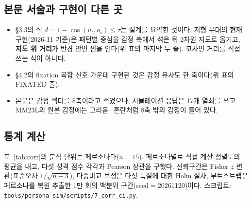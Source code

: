 \documentclass[11pt, a4paper]{article}
\begin{document}
\subsection{본문 서술과 구현이 다른 곳}

\begin{itemize}
  \item \S3.3의 식 $d = 1 - \cos(u_t, o_s) \leq \tau$는 설계를 요약한 것이다. 지형 무대의 현재 구현(2026-11 기준)은 패턴별 중심을 감정 축에서 섞은 뒤 2차원 지도로 옮기고, \textbf{지도 위 거리}가 반경 안인 씬을 연다(위 표의 마지막 두 줄). 코사인 거리를 직접 쓰는 식이 아니다.
  \item \S4.2의 fixation 복합 신호 가운데 구현된 것은 감정 유사도 한 축이다(위 표의 FIXATED 줄).
  \item 본문은 감정 벡터를 8축이라고 적었으나, 시뮬레이션 응답은 17개 열쇠를 쓰고 MM23L의 원본 감정에는 그리움·혼란처럼 8축 밖의 감정이 들어 있다.
\end{itemize}

\subsection{통계 계산}
\label{app:stats}

표~\ref{tab:corr}의 분석 단위는 페르소나다($n=15$). 페르소나별로 직접 계산 정렬도의 평균을 내고, 다섯 성격 점수 각각과 Pearson 상관을 구했다. 신뢰구간은 Fisher $z$ 변환(표준오차 $1/\sqrt{n-3}$), 다중비교 보정은 다섯 특질에 대한 Holm 절차, 부트스트랩은 페르소나를 복원 추출한 1만 회의 백분위 구간(seed$=$20261120)이다. 스크립트: \texttt{tools/persona-sim/scripts/7\_corr\_ci.py}.

\end{document}
